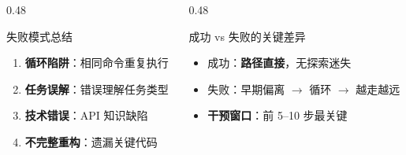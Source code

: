 \documentclass[aspectratio=169,10pt]{beamer}
\begin{document}
\begin{frame}
  \begin{columns}[T]
    \begin{column}{0.48\textwidth}
      \begin{block}{失败模式总结}
        \begin{enumerate}
          \item \textbf{循环陷阱}：相同命令重复执行
          \item \textbf{任务误解}：错误理解任务类型
          \item \textbf{技术错误}：API 知识缺陷
          \item \textbf{不完整重构}：遗漏关键代码
        \end{enumerate}
      \end{block}
    \end{column}
    \begin{column}{0.48\textwidth}
      \begin{alertblock}{成功 vs 失败的关键差异}
        \begin{itemize}
          \item 成功：\textbf{路径直接}，无探索迷失
          \item 失败：早期偏离 $\rightarrow$ 循环 $\rightarrow$ 越走越远
          \item \textbf{干预窗口}：前 5--10 步最关键
        \end{itemize}
      \end{alertblock}
    \end{column}
  \end{columns}
\end{frame}
\end{document}

